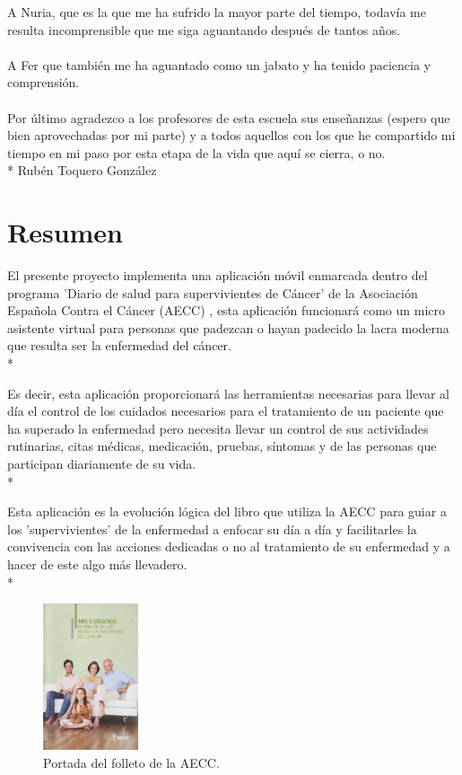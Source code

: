 \documentclass[b5paper,10pt,twoside]{book}
\begin{document}
{		A Nuria, que es la que me ha sufrido la mayor parte del tiempo, todavía me resulta incomprensible que me siga aguantando después de tantos años.\\\\
		A Fer que también me ha aguantado como un jabato y ha tenido paciencia y comprensión.\\\\
		Por último agradezco a los profesores de esta escuela sus enseñanzas (espero que bien aprovechadas por mi parte) y a todos aquellos con los que he compartido mi tiempo en mi paso por esta etapa de la vida que aquí se cierra, o no.\\*
		Rubén Toquero González} 
	

	\chapter*{Resumen}
		El presente proyecto implementa una aplicación móvil enmarcada dentro del programa 'Diario de salud para supervivientes de Cáncer' de la Asociación Española Contra el Cáncer (AECC) \cite{aecc}, esta aplicación funcionará como un micro asistente virtual para personas que padezcan o hayan padecido la lacra moderna que resulta ser la enfermedad del cáncer.\\*
		
		Es decir, esta aplicación proporcionará las herramientas necesarias para llevar al día el control de los cuidados necesarios para el tratamiento de un paciente que ha superado la enfermedad pero necesita llevar un control de sus actividades rutinarias, citas médicas, medicación, pruebas, síntomas y de las personas que participan diariamente de su vida.\\*
		
		Esta aplicación es la evolución lógica del libro que utiliza la AECC para guiar a los 'supervivientes' de la enfermedad a enfocar su día a día y facilitarles la convivencia con las acciones dedicadas o no al tratamiento de su enfermedad y a hacer de este algo más llevadero.\\*
		
	 	
	\begin{figure}[h]
		\centering
		\includegraphics[width=0.25\textwidth]{fotointro}
		\caption{Portada del folleto de la AECC.}
		\label{fig:mesh1}
	\end{figure}
	 
\end{document}
